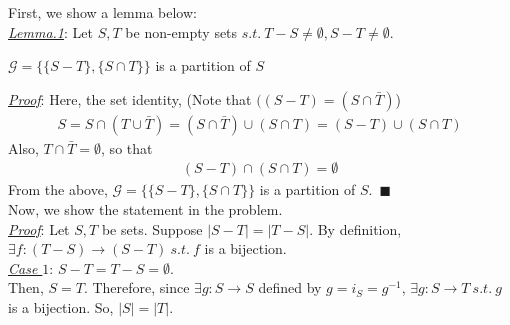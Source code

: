 \documentclass[12pt]{article}
\begin{document}
\begin{center}
\end{center}
First, we show a lemma below:\\
\underline{\textit{Lemma.1}}: Let $S, T$ be non-empty sets $s.t.~ T - S \neq \emptyset, S - T \neq \emptyset$. 
\begin{center}
$\mathcal{G} = \{\{S - T\}, \{ S \cap T \} \}$ is a partition of $S$
\end{center}
\underline{\textit{Proof}}:
Here, the set identity, (Note that $( (S - T) = (S \cap \bar{T})$)
\begin{gather*}
S = S \cap (T \cup \bar{T}) = (S \cap \bar{T}) \cup (S \cap T) = (S - T) \cup (S \cap T)
\end{gather*}
Also, $T \cap \bar{T} = \emptyset$, so that
\begin{gather*}
(S - T) \cap (S \cap T) = \emptyset
\end{gather*}
From the above, $\mathcal{G} = \{\{S - T\}, \{ S \cap T \} \}$ is a partition of $S$.~$\blacksquare$\\[1em]
Now, we show the statement in the problem.\\[1em]
\underline{\textit{Proof}}: Let $S,T$ be sets. Suppose $|S-T| = |T-S|$. By definition, $\exists f: (T-S) \longrightarrow (S-T) ~s.t.~ f$ is a bijection.\\[1em]
\underline{\textit{Case $1$}}: $S - T = T - S = \emptyset$.\\[1em]
Then, $S = T$. Therefore, since $\exists g: S \longrightarrow S$ defined by $g = i_S = g^{-1}$, $\exists g: S \longrightarrow T ~s.t.~ g$ is a bijection. So, $|S| = |T|$.\\[1em]
\end{document}
